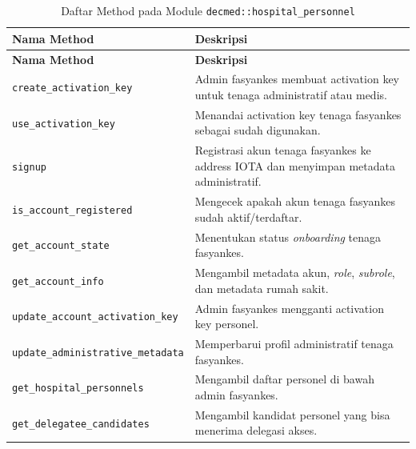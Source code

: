 \documentclass[bahasa, 12pt, a4paper, onecolumn, oneside, final]{report}
\begin{document}
\begin{longtable}{|Y{0.45\textwidth}|Y{0.47\textwidth}|}
	\caption{Daftar Method pada Module \texttt{decmed::hospital\_personnel}}
	\label{tab:daftar-method-decmed-hospital-personnel}                                                                                \\
	\hline
	\textbf{Nama Method}                      & \textbf{Deskripsi}                                                                     \\
	\hline
	\endfirsthead
	\hline
	\textbf{Nama Method}                      & \textbf{Deskripsi}                                                                     \\
	\hline
	\endhead

	\texttt{create\_activation\_key}          & Admin fasyankes membuat activation key untuk tenaga administratif atau medis.          \\ \hline
	\texttt{use\_activation\_key}             & Menandai activation key tenaga fasyankes sebagai sudah digunakan.                      \\ \hline
	\texttt{signup}                           & Registrasi akun tenaga fasyankes ke address IOTA dan menyimpan metadata administratif. \\ \hline
	\texttt{is\_account\_registered}          & Mengecek apakah akun tenaga fasyankes sudah aktif/terdaftar.                           \\ \hline
	\texttt{get\_account\_state}              & Menentukan status \textit{onboarding} tenaga fasyankes.                                \\ \hline
	\texttt{get\_account\_info}               & Mengambil metadata akun, \textit{role}, \textit{subrole}, dan metadata rumah sakit.    \\ \hline
	\texttt{update\_account\_activation\_key} & Admin fasyankes mengganti activation key personel.                                     \\ \hline
	\texttt{update\_administrative\_metadata} & Memperbarui profil administratif tenaga fasyankes.                                     \\ \hline
	\texttt{get\_hospital\_personnels}        & Mengambil daftar personel di bawah admin fasyankes.                                    \\ \hline
	\texttt{get\_delegatee\_candidates}       & Mengambil kandidat personel yang bisa menerima delegasi akses.                         \\ \hline

\end{longtable}
\end{document}
